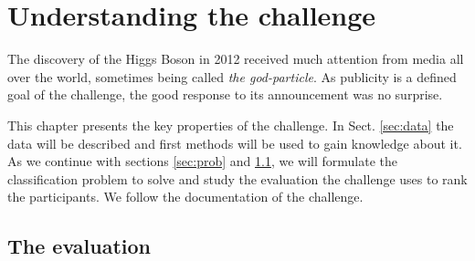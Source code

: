 \section{Understanding the challenge}\label{ch:challenge}

The discovery of the Higgs Boson in 2012 received much attention from media all over the world, sometimes being called \emph{the god-particle}. As publicity is a defined goal of the challenge, the good response to its announcement was no surprise.

This chapter presents the key properties of the challenge. In Sect. \ref{sec:data} the data will be described and first methods will be used to gain knowledge about it.
As we continue with sections \ref{sec:prob} and \ref{sec:eval}, we will formulate the classification problem to solve and study the evaluation the challenge uses to rank the participants. We follow the documentation of the challenge\cite{higgsPaper}.






\subsection{The evaluation}\label{sec:eval}




%
\pagebreak

	{\pagebreak \thispagestyle{empty} \cleardoublepage}{\clearpage}